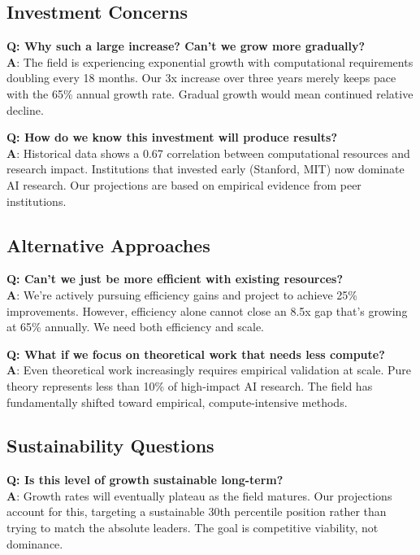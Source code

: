 \documentclass{article}
\begin{document}
\subsection{Investment Concerns}

\textbf{Q: Why such a large increase? Can't we grow more gradually?}\\
\textbf{A}: The field is experiencing exponential growth with computational requirements doubling every 18 months. Our 3x increase over three years merely keeps pace with the 65\% annual growth rate. Gradual growth would mean continued relative decline.

\textbf{Q: How do we know this investment will produce results?}\\
\textbf{A}: Historical data shows a 0.67 correlation between computational resources and research impact. Institutions that invested early (Stanford, MIT) now dominate AI research. Our projections are based on empirical evidence from peer institutions.

\subsection{Alternative Approaches}

\textbf{Q: Can't we just be more efficient with existing resources?}\\
\textbf{A}: We're actively pursuing efficiency gains and project to achieve 25\% improvements. However, efficiency alone cannot close an 8.5x gap that's growing at 65\% annually. We need both efficiency and scale.

\textbf{Q: What if we focus on theoretical work that needs less compute?}\\
\textbf{A}: Even theoretical work increasingly requires empirical validation at scale. Pure theory represents less than 10\% of high-impact AI research. The field has fundamentally shifted toward empirical, compute-intensive methods.

\subsection{Sustainability Questions}

\textbf{Q: Is this level of growth sustainable long-term?}\\
\textbf{A}: Growth rates will eventually plateau as the field matures. Our projections account for this, targeting a sustainable 30th percentile position rather than trying to match the absolute leaders. The goal is competitive viability, not dominance.
\end{document}
